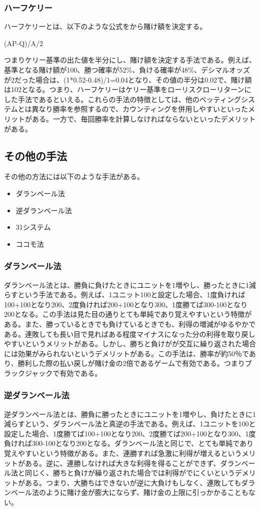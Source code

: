 \subsubsection{ハーフケリー}
ハーフケリーとは、以下のような公式をから賭け額を決定する。
\begin{center}
(AP-Q)/A/2
\end{center}
つまりケリー基準の出た値を半分にし、賭け額を決定する手法である。例えば、基準となる賭け額が100、勝つ確率が52\%、負ける確率が48\%、デシマルオッズが2だった場合は、(1*0.52-0.48)/1=0.04となり、その値の半分は0.02で、賭け額は102となる。つまり、ハーフケリーはケリー基準をローリスクローリターンにした手法であるといえる。これらの手法の特徴としては、他のベッティングシステムとは異なり勝率を参照するので、カウンティングを併用しやすいといったメリットがある。一方で、毎回勝率を計算しなければならないといったデメリットがある。

\subsection{その他の手法}
その他の方法には以下のような手法がある。
\begin{itemize}
\item ダランベール法
\item 逆ダランベール法
\item 31システム
\item ココモ法
\end{itemize}
\subsubsection{ダランベール法}
ダランベール法とは、勝負に負けたときにユニットを1増やし、勝ったときに1減らすという手法である。例えば、1ユニット100と設定した場合、1度負ければ100+100となり200、2度負ければ200+100となり300、1度勝てば300-100となり200となる。この手法は見た目の通りとても単純であり覚えやすいという特徴がある。また、勝っているときでも負けているときでも、利得の増減がゆるやかである。連敗しても長い目で見ればある程度マイナスになった分の利得を取り戻しやすいというメリットがある。しかし、勝ちと負けがが交互に繰り返された場合には効果がみられないというデメリットがある。この手法は、勝率が約50％であり、勝利した際の払い戻しが賭け金の2倍であるゲームで有効である。つまりブラックジャックで有効である。
\subsubsection{逆ダランベール法}
逆ダランベール法とは、勝負に勝ったときにユニットを1増やし、負けたときに1減らすという、ダランベール法と真逆の手法である。例えば、1ユニットを100と設定した場合、1度勝てば100+100となり200、2度勝てば200+100となり300、1度負ければ300-100となり200となる。ダランベール法と同じで、とても単純であり覚えやすいという特徴がある。また、連勝すれば急激に利得が増えるというメリットがある。逆に、連勝しなければ大きな利得を得ることができず、ダランベール法と同じく、勝ちと負けが繰り返された場合では利得がでにくいというデメリットがある。つまり、大勝ちはできないが逆に大負けもしなく、連敗してもダランベール法のように賭け金が膨大にならず、賭け金の上限に引っかかることもない。

